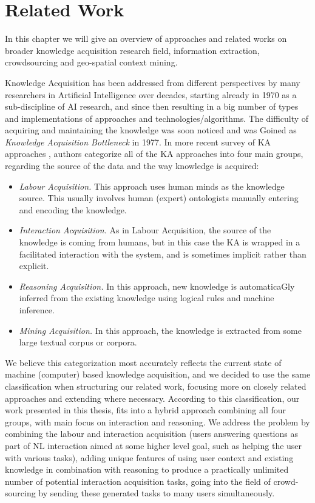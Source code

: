\chapter{Related Work}

In this chapter we will give an overview of approaches and related works on
broader knowledge acquisition research field, information extraction, 
crowdsourcing and geo-spatial context mining. 

Knowledge Acquisition has been addressed from different perspectives by many 
researchers in Artificial Intelligence over decades, starting already in 1970 
as a sub-discipline of AI research, and since then resulting in a big number of 
types and implementations of approaches and technologies/algorithms. The 
difficulty of acquiring and maintaining the knowledge was soon noticed and was 
Goined as \emph{Knowledge Acquisition Bottleneck} in 
1977\parencite{Feigenbaum1977}. In more recent survey of KA approaches 
\parencite{Zang2013}, authors categorize all of the KA approaches into four main
groups, regarding the source of the data and the way knowledge is acquired:
\begin{itemize}
	\item \emph{Labour Acquisition.} This approach uses human minds as the 
    knowledge source. This usually involves human (expert) ontologists manually 
    entering and encoding the knowledge.
	\item \emph{Interaction Acquisition.} As in Labour Acquisition, the source 
    of the knowledge is coming from humans, but in this case the KA is wrapped 
    in a facilitated interaction with the system, and is sometimes implicit 
    rather than explicit.
	\item \emph{Reasoning Acquisition.} In this approach, new knowledge is 
    automaticaGly inferred from the existing knowledge using logical rules and 
    machine inference.
	\item \emph{Mining Acquisition.} In this approach, the knowledge is 
    extracted from some large textual corpus or corpora.
\end{itemize}

We believe this categorization most accurately reflects the current state of 
machine (computer) based knowledge acquisition, and we decided to use the same 
classification when structuring our related work, focusing more on closely 
related approaches and extending where necessary. According to this 
classification, our work presented in this thesis, fits into a hybrid approach 
combining all four groups, with main focus on interaction and reasoning. We 
address the problem by combining the labour and interaction acquisition (users 
answering questions as part of NL interaction aimed at some higher level goal, 
such as helping the user with various tasks), adding unique features of using 
user context and existing knowledge in combination with reasoning to produce a 
practically unlimited number of potential interaction acquisition tasks, going 
into the field of crowd-sourcing by sending these generated tasks to many users 
simultaneously.

